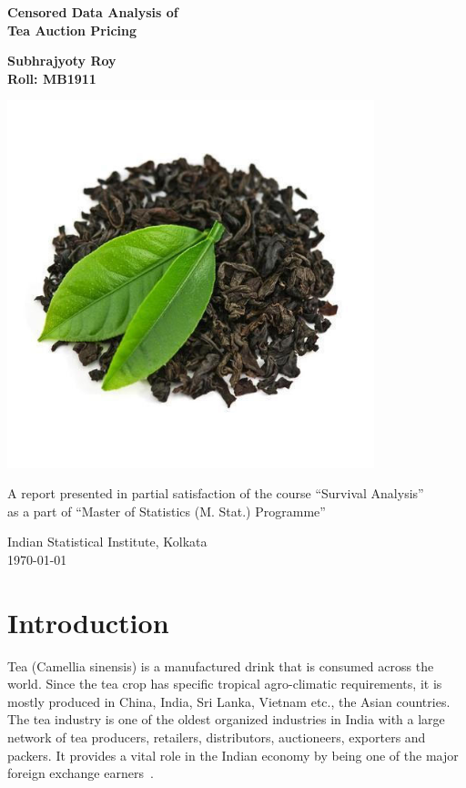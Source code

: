 \documentclass[a4paper,12pt]{article}
\begin{document}
\begin{titlepage}
    \begin{center}
        \vspace*{1cm}
 
        \Huge{\textbf{Censored Data Analysis of\\ Tea Auction Pricing}}
         \vspace{1.5cm}
 
        \Large{\textbf{Subhrajyoty Roy\\Roll: MB1911}}
 
        \vspace{1cm}
        \includegraphics[width = 0.8\textwidth]{tealeaf.jpg}

        \vfill
             
        \normalsize{A report presented in partial satisfaction of the course ``Survival Analysis''\\
        as a part of ``Master of Statistics (M. Stat.) Programme''}
             
        \vspace{0.8cm}
                  
        Indian Statistical Institute, Kolkata\\
        \today             
    \end{center}
 \end{titlepage}


\section{Introduction}
Tea (Camellia sinensis) is a manufactured drink that is consumed across the world. Since the tea crop has specific tropical agro-climatic requirements, it is mostly produced in China, India, Sri Lanka, Vietnam etc., the Asian countries. The tea industry is one of the oldest organized industries in India with a large network of tea producers, retailers, distributors, auctioneers, exporters and packers. It provides a vital role in the Indian economy by being one of the major foreign exchange earners~\cite{sivanesan2013tea}. 
\end{document}
